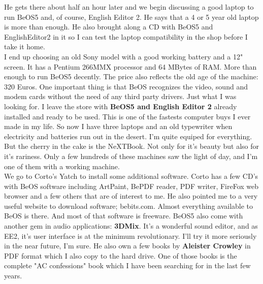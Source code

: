 \documentclass[11pt,twoside,a4paper]{book}
\begin{document}
\begin{multicols*}{2}
    He gets there about half an hour later and we begin discussing a good laptop to run BeOS5 and, of course, English Editor 2. He says that a 4 or 5 year old laptop is more than enough. He also brought along a CD with BeOS5 and EnglishEditor2 in it so I can test the laptop compatibility in the shop before I take it home. ~\\

    I end up choosing an old Sony model with a good working battery and a 12" screen. It has a Pentium 266MMX processor and 64 MBytes of RAM. More than enough to run BeOS5 decently. The price also reflects the old age of the machine: 320 Euros. One important thing is that BeOS recognizes the video, sound and modem cards without the need of any third party drivers. Just what I was looking for. I leave the store with \textbf{BeOS5 and English Editor 2} already installed and ready to be used. This is one of the fastests computer buys I ever made in my life. So now I have three laptops and an old typewriter when electricity and batteries run out in the desert. I'm quite equiped for everything. But the cherry in the cake is the NeXTBook. Not only for it's beauty but also for it's rariness. Only a few hundreds of these machines saw the light of day, and I'm one of them with a working machine. ~\\

    We go to Corto's Yatch to install some additional software. Corto has a few CD's with BeOS software including ArtPaint, BePDF reader, PDF writer, FireFox web browser and a few others that are of interest to me. He also pointed me to a very useful website to download software; bebits.com. Almost everything available to BeOS is there. And most of that software is freeware. BeOS5 also come with another gem in audio applications: \textbf{3DMix}. It's a wonderful sound editor, and as EE2, it's user interface is at the minimum revolutionary. I'll try it more seriously in the near future, I'm sure. He also own a few books by \textbf{Aleister Crowley} in PDF format which I also copy to the hard drive. One of those books is the complete "AC confessions" book which I have been searching for in the last few years. ~\\


\end{multicols*}
\end{document}
